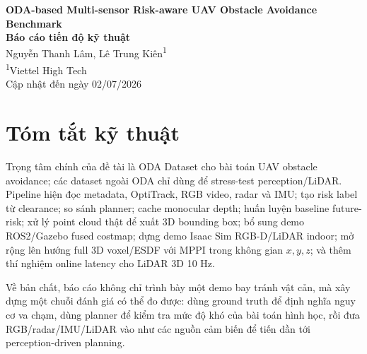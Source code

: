 \documentclass[10pt,a4paper]{article}
\newcommand{\TenDeTai}{ODA-based Multi-sensor Risk-aware UAV Obstacle Avoidance Benchmark}
\newcommand{\SinhVien}{Nguyễn Thanh Lâm}
\newcommand{\Mentor}{Lê Trung Kiên}
\newcommand{\DonViMentor}{Viettel High Tech}
\begin{document}
\begin{center}
{\Large\bfseries \TenDeTai}\\[3pt]
{\large\bfseries Báo cáo tiến độ kỹ thuật}\\[4pt]
{\normalsize \SinhVien, \Mentor\textsuperscript{1}}\\
{\small \textsuperscript{1}\DonViMentor}\\[3pt]
{\small Cập nhật đến ngày 02/07/2026}
\end{center}

\section*{Tóm tắt kỹ thuật}

Trọng tâm chính của đề tài là ODA Dataset cho bài toán UAV obstacle avoidance; các dataset ngoài ODA chỉ dùng để stress-test perception/LiDAR. Pipeline hiện đọc metadata, OptiTrack, RGB video, radar và IMU; tạo risk label từ clearance; so sánh planner; cache monocular depth; huấn luyện baseline future-risk; xử lý point cloud thật để xuất 3D bounding box; bổ sung demo ROS2/Gazebo fused costmap; dựng demo Isaac Sim RGB-D/LiDAR indoor; mở rộng lên hướng full 3D voxel/ESDF với MPPI trong không gian \(x,y,z\); và thêm thí nghiệm online latency cho LiDAR 3D 10 Hz.

Về bản chất, báo cáo không chỉ trình bày một demo bay tránh vật cản, mà xây dựng một chuỗi đánh giá có thể đo được: dùng ground truth để định nghĩa nguy cơ va chạm, dùng planner để kiểm tra mức độ khó của bài toán hình học, rồi đưa RGB/radar/IMU/LiDAR vào như các nguồn cảm biến để tiến dần tới perception-driven planning.
\end{document}
